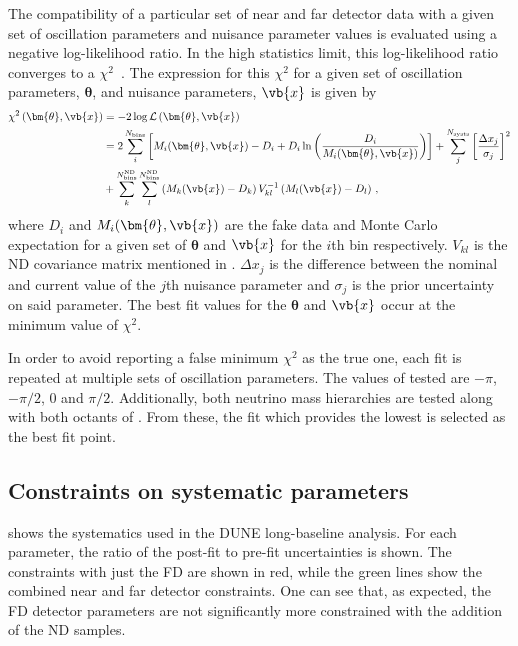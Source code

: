 The compatibility of a particular set of near and far detector data with a given set of oscillation parameters and nuisance parameter values is evaluated using a negative log-likelihood ratio.
In the high statistics limit, this log-likelihood ratio converges to a $\chi^{2}$~\cite{pdg2018}.
The expression for this $\chi^{2}$ for a given set of oscillation parameters, $\bm{\theta}$, and nuisance parameters, $\vb{x}$ is given by
\begin{align}
	\chi^{2} \left( \bm{\theta}, \vb{x} \right) &= -2 \log \mathcal{L} \left( \bm{\theta}, \vb{x} \right) \\
	&= 2 \sum_{i}^{N_{\text{bins}}} \left[ M_{i} (\bm{\theta}, \vb{x}) - D_{i} + D_{i} \ln \left( \frac{D_{i}}{M_{i}(\bm{\theta}, \vb{x})} \right) \right] + \sum_{j}^{N_{\text{systs}}} \left[ \frac{\Delta x_{j}}{\sigma_{j}} \right]^{2} \\
	&+ \sum_{k}^{N^{\text{ND}}_{\text{bins}}} \sum_{l}^{ N_{\text{bins}}^{\text{ND}} } \left(  M_{k} (\vb{x}) - D_{k} \right) V_{kl}^{-1} \left( M_{l}(\vb{x}) - D_{l} \right) \, ,
\end{align}
where $D_{i}$ and $M_{i}(\bm{\theta}, \vb{x})$ are the fake data and Monte Carlo expectation for a given set of $\bm{\theta}$ and $\vb{x}$ for the $i$th bin respectively. 
$V_{kl}$ is the ND covariance matrix mentioned in .
$\Delta x_{j}$ is the difference between the nominal and current value of the $j$th nuisance parameter and $\sigma_{j}$ is the prior uncertainty on said parameter.
The best fit values for the $\bm{\theta}$ and $\vb{x}$ occur at the minimum value of $\chi^{2}$.

In order to avoid reporting a false minimum $\chi^{2}$ as the true one, each fit is repeated at multiple sets of oscillation parameters. 
The values of \dcp tested are $-\pi$, $-\pi/2$, 0 and $\pi/2$. 
Additionally, both neutrino mass hierarchies are tested along with both octants of .
From these, the fit which provides the lowest \chisquare is selected as the best fit point.


\subsection{Constraints on systematic parameters}

 shows the systematics used in the DUNE long-baseline analysis.
For each parameter, the ratio of the post-fit to pre-fit uncertainties is shown.
The constraints with just the FD are shown in red, while the green lines show the combined near and far detector constraints.
One can see that, as expected, the FD detector parameters are not significantly more constrained with the addition of the ND samples. 

